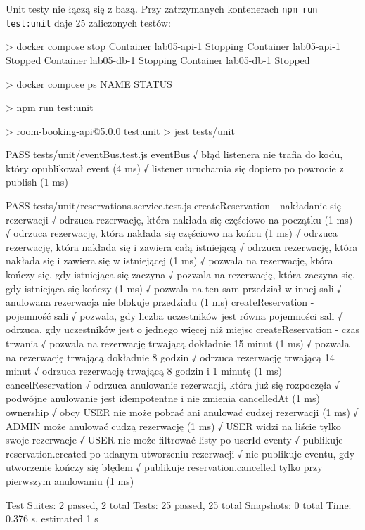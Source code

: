 \documentclass[12pt,a4paper]{article}
\begin{document}
Unit testy nie łączą się z bazą. Przy zatrzymanych kontenerach \texttt{npm run test:unit} daje 25 zaliczonych testów:

\begin{terminal}
> docker compose stop
 Container lab05-api-1 Stopping
 Container lab05-api-1 Stopped
 Container lab05-db-1 Stopping
 Container lab05-db-1 Stopped

> docker compose ps
NAME      STATUS

> npm run test:unit

> room-booking-api@5.0.0 test:unit
> jest tests/unit

PASS tests/unit/eventBus.test.js
  eventBus
    √ błąd listenera nie trafia do kodu, który opublikował event (4 ms)
    √ listener uruchamia się dopiero po powrocie z publish (1 ms)

PASS tests/unit/reservations.service.test.js
  createReservation - nakładanie się rezerwacji
    √ odrzuca rezerwację, która nakłada się częściowo na początku (1 ms)
    √ odrzuca rezerwację, która nakłada się częściowo na końcu (1 ms)
    √ odrzuca rezerwację, która nakłada się i zawiera całą istniejącą
    √ odrzuca rezerwację, która nakłada się i zawiera się w istniejącej (1 ms)
    √ pozwala na rezerwację, która kończy się, gdy istniejąca się zaczyna
    √ pozwala na rezerwację, która zaczyna się, gdy istniejąca się kończy (1 ms)
    √ pozwala na ten sam przedział w innej sali
    √ anulowana rezerwacja nie blokuje przedziału (1 ms)
  createReservation - pojemność sali
    √ pozwala, gdy liczba uczestników jest równa pojemności sali
    √ odrzuca, gdy uczestników jest o jednego więcej niż miejsc
  createReservation - czas trwania
    √ pozwala na rezerwację trwającą dokładnie 15 minut (1 ms)
    √ pozwala na rezerwację trwającą dokładnie 8 godzin
    √ odrzuca rezerwację trwającą 14 minut
    √ odrzuca rezerwację trwającą 8 godzin i 1 minutę (1 ms)
  cancelReservation
    √ odrzuca anulowanie rezerwacji, która już się rozpoczęła
    √ podwójne anulowanie jest idempotentne i nie zmienia cancelledAt (1 ms)
  ownership
    √ obcy USER nie może pobrać ani anulować cudzej rezerwacji (1 ms)
    √ ADMIN może anulować cudzą rezerwację (1 ms)
    √ USER widzi na liście tylko swoje rezerwacje
    √ USER nie może filtrować listy po userId
  eventy
    √ publikuje reservation.created po udanym utworzeniu rezerwacji
    √ nie publikuje eventu, gdy utworzenie kończy się błędem
    √ publikuje reservation.cancelled tylko przy pierwszym anulowaniu (1 ms)

Test Suites: 2 passed, 2 total
Tests:       25 passed, 25 total
Snapshots:   0 total
Time:        0.376 s, estimated 1 s
\end{terminal}
\end{document}
